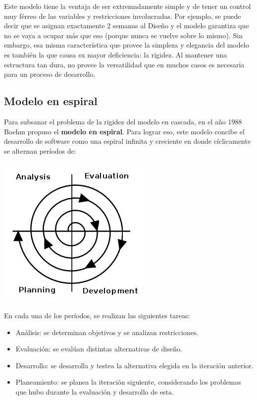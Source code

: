 \documentclass[]{article}
\begin{document}
Este modelo tiene la ventaja de ser extremadamente simple y de tener un control muy férreo de las variables y restricciones involucradas. Por ejemplo, se puede decir que se asignan exactamente 2 semanas al Diseño y el modelo garantiza que no se vaya a ocupar más que eso (porque nunca se vuelve sobre lo mismo). Sin embargo, esa misma característica que provee la simpleza y elegancia del modelo es también la que causa su mayor deficiencia: la rigidez. Al mantener una estructura tan dura, no provee la versatilidad que en muchos casos es necesaria para un proceso de desarrollo.

\subsection{Modelo en espiral}

Para subsanar el problema de la rigidez del modelo en cascada, en el año 1988 Boehm propuso el \textbf{modelo en espiral}. Para lograr eso, este modelo concibe el desarrollo de software como una espiral infinita y creciente en donde cíclicamente se alternan períodos de:

\begin{center}
	\includegraphics[scale=0.60]{Spiral.png}
\end{center}

En cada una de los períodos, se realizan las siguientes tareas:
\begin{itemize}
	\item Análisis: se determinan objetivos y se analizan restricciones.
	\item Evaluación: se evalúan distintas alternativas de diseño.
	\item Desarrollo: se desarrolla y testea la alternativa elegida en la iteración anterior.
	\item Planeamiento: se planea la iteración siguiente, considerando los problemas que hubo durante la evaluación y desarrollo de esta.
\end{itemize}
\end{document}
